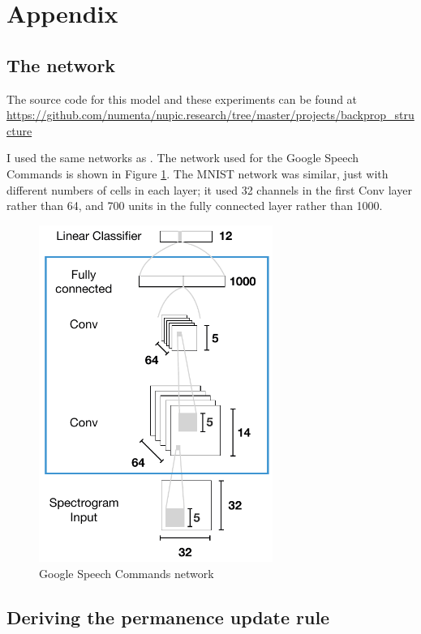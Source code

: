 \documentclass[11pt]{article}
\begin{document}
\section{Appendix}
\label{sec:org155eddc}


\subsection{The network}
\label{sec:org702a269}
The source code for this model and these experiments can be found at \linebreak \url{https://github.com/numenta/nupic.research/tree/master/projects/backprop\_structure}

I used the same networks as \citep{ahmad2019dense}. The network used for the Google Speech Commands is shown in Figure \ref{fig:architecture-gsc}. The MNIST network was similar, just with different numbers of cells in each layer; it used 32 channels in the first Conv layer rather than 64, and 700 units in the fully connected layer rather than 1000.

\begin{figure}[htbp]
\centering
\includegraphics[width=3in]{./figures/architecture-gsc.pdf}
\caption{Google Speech Commands network \label{fig:architecture-gsc}}
\end{figure}




\subsection{Deriving the permanence update rule}
\label{sec:orgc3f0339}
\end{document}
